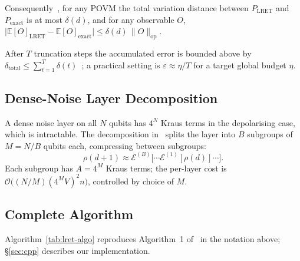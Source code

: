 \documentclass[11pt,a4paper]{article}
\begin{document}
Consequently~\cite{chen2021lret}, for any POVM the total variation distance between
$P_{\mathrm{LRET}}$ and $P_{\mathrm{exact}}$ is at most $\delta(d)$, and for any
observable $O$,
$\bigl|\mathbb{E}[O]_{\mathrm{LRET}}-\mathbb{E}[O]_{\mathrm{exact}}\bigr|
 \le \delta(d)\,\|O\|_{\mathrm{op}}$.

After $T$ truncation steps the accumulated error is bounded above by
$\delta_{\mathrm{total}} \le \sum_{t=1}^{T} \delta(t)$~\cite{chen2021lret}; a
practical setting is $\varepsilon \approx \eta/T$ for a target global budget $\eta$.

\subsection{Dense-Noise Layer Decomposition}
\label{sec:math-dense}

A dense noise layer on all $N$ qubits has $4^N$ Kraus terms in the depolarising case,
which is intractable. The decomposition
in~\cite{chen2021lret} splits the layer into $B$ subgroups of $M = N/B$ qubits each,
compressing between subgroups:
\begin{equation}
  \rho(d+1) \approx \mathcal{E}^{(B)}\bigl[\cdots \mathcal{E}^{(1)}[\rho(d)]\cdots\bigr].
\end{equation}
Each subgroup has $A=4^M$ Kraus terms; the per-layer cost is
$\mathcal{O}\bigl((N/M)(4^M V)^2 n\bigr)$, controlled by choice of $M$.

\subsection{Complete Algorithm}
\label{sec:math-alg}

Algorithm~\ref{tab:lret-algo} reproduces Algorithm~1 of~\cite{chen2021lret} in the
notation above; \S\ref{sec:cpp} describes our implementation.
\end{document}
